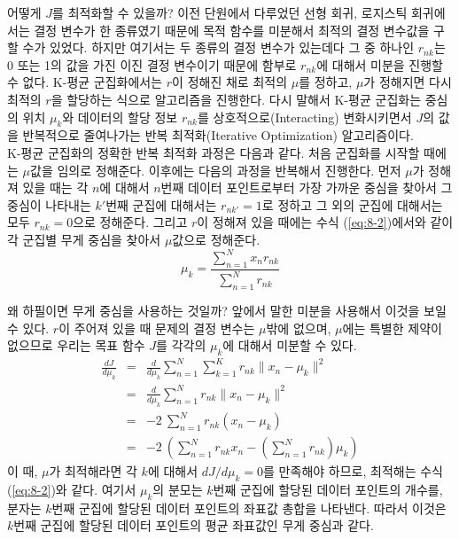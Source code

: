 \documentclass[a4paper]{oblivoir}
\begin{document}
어떻게 $J$를 최적화할 수 있을까? 이전 단원에서 다루었던 선형 회귀, 로지스틱 회귀에서는 결정 변수가 한 종류였기 때문에 목적 함수를 미분해서 최적의 결정 변수값을 구할 수가 있었다. 하지만 여기서는 두 종류의 결정 변수가 있는데다 그 중 하나인 $r_{nk}$는 0 또는 1의 값을 가진 이진 결정 변수이기 때문에 함부로 $r_{nk}$에 대해서 미분을 진행할 수 없다. K-평균 군집화에서는 $r$이 정해진 채로 최적의 $\mu$를 정하고, $\mu$가 정해지면 다시 최적의 $r$을 할당하는 식으로 알고리즘을 진행한다. 다시 말해서 K-평균 군집화는 중심의 위치 $\mu_{k}$와 데이터의 할당 정보 $r_{nk}$를 상호적으로(Interacting) 변화시키면서 $J$의 값을 반복적으로 줄여나가는 반복 최적화(Iterative Optimization) 알고리즘이다. \\

K-평균 군집화의 정확한 반복 최적화 과정은 다음과 같다. 처음 군집화를 시작할 때에는 $\mu$값을 임의로 정해준다. 이후에는 다음의 과정을 반복해서 진행한다. 먼저 $\mu$가 정해져 있을 때는 각 $n$에 대해서 $n$번째 데이터 포인트로부터 가장 가까운 중심을 찾아서 그 중심이 나타내는 $k'$번째 군집에 대해서는 $r_{nk'}=1$로 정하고 그 외의 군집에 대해서는 모두 $r_{nk}=0$으로 정해준다. 그리고 $r$이 정해져 있을 때에는 수식 (\ref{eq:8-2})에서와 같이 각 군집별 무게 중심을 찾아서 $\mu$값으로 정해준다.  
\begin{equation}
\mu_{k} = \frac{\sum_{n=1}^{N} x_{n}r_{nk} }{ \sum_{n=1}^{N} r_{nk} }
\label{eq:8-2}
\end{equation}

왜 하필이면 무게 중심을 사용하는 것일까? 앞에서 말한 미분을 사용해서 이것을 보일 수 있다. $r$이 주어져 있을 때 문제의 결정 변수는 $\mu$밖에 없으며, $\mu$에는 특별한 제약이 없으므로 우리는 목표 함수 $J$를 각각의 $\mu_k$에 대해서 미분할 수 있다. 
\begin{eqnarray}
\frac{dJ}{d\mu_k} & = & \frac{d}{d\mu_k} \sum_{n=1}^{N} \sum_{k=1}^{K} r_{nk} \lVert x_{n} - \mu_{k} \rVert^{2} \nonumber \\
& = & \frac{d}{d\mu_k} \sum_{n=1}^{N} r_{nk} \lVert x_{n} - \mu_{k} \rVert^{2} \nonumber \\
& = & -2 \ \sum_{n=1}^{N} r_{nk} (x_{n} - \mu_{k}) \nonumber \\
& = & -2 \ (\sum_{n=1}^{N} r_{nk}x_{n} - (\sum_{n=1}^{N} r_{nk})\mu_{k} ) \label{eq:8-3}
\end{eqnarray}
이 때, $\mu$가 최적해라면 각 $k$에 대해서 ${dJ}/{d\mu_k}=0$를 만족해야 하므로, 최적해는 수식 (\ref{eq:8-2})와 같다. 여기서 $\mu_{k}$의 분모는 $k$번째 군집에 할당된 데이터 포인트의 개수를, 분자는 $k$번째 군집에 할당된 데이터 포인트의 좌표값 총합을 나타낸다. 따라서 이것은 $k$번째 군집에 할당된 데이터 포인트의 평균 좌표값인 무게 중심과 같다. \\
\end{document}
